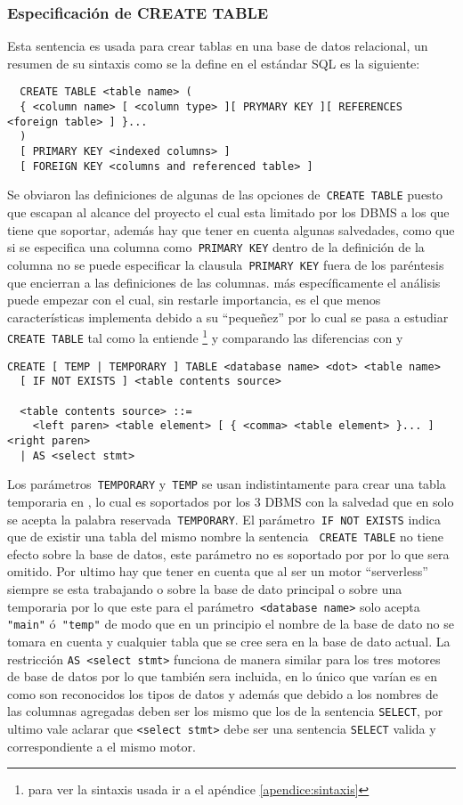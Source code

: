 \subsubsection{Especificación de CREATE TABLE} 
\label{especificacion:dialectos:create}
Esta sentencia es usada para crear tablas en una base de datos relacional, un resumen de su sintaxis como se la define en el estándar SQL es la siguiente:
\begin{Verbatim}
  CREATE TABLE <table name> (
  { <column name> [ <column type> ][ PRYMARY KEY ][ REFERENCES <foreign table> ] }...
  )
  [ PRIMARY KEY <indexed columns> ]
  [ FOREIGN KEY <columns and referenced table> ]
\end{Verbatim}
%
Se obviaron las definiciones de algunas de las opciones de\verb= CREATE TABLE= puesto que escapan al alcance del proyecto el cual esta limitado por los DBMS a los que tiene que soportar, además hay que tener en cuenta algunas salvedades, como que si se especifica una columna como\verb= PRIMARY KEY= dentro de la definición de la columna no se puede especificar la clausula\verb= PRIMARY KEY= fuera de los paréntesis que encierran a las definiciones de las columnas. más específicamente el análisis puede empezar con \s el cual, sin restarle importancia, es el que menos características implementa debido a su ``pequeñez'' por lo cual se pasa a estudiar\verb= CREATE TABLE= tal como la entiende \s\cite{sqlite:sql}\footnote{para ver la sintaxis usada ir a el apéndice \ref{apendice:sintaxis} } y comparando las diferencias con \m\citep{mysql:sql} y \p\citep{postgre:sql}
%
\begin{Verbatim}[frame=leftline, framesep=3mm]
  CREATE [ TEMP | TEMPORARY ] TABLE <database name> <dot> <table name> 
  [ IF NOT EXISTS ] <table contents source>

  <table contents source> ::=
    <left paren> <table element> [ { <comma> <table element> }... ] <right paren>
  | AS <select stmt>
\end{Verbatim}
%
Los parámetros\verb= TEMPORARY= y\verb= TEMP= se usan indistintamente para crear una tabla temporaria en \s, lo cual es soportados por los 3 DBMS con la salvedad que en \m solo se acepta la palabra reservada\verb= TEMPORARY=. El parámetro\verb= IF NOT EXISTS= indica que de existir una tabla del mismo nombre la sentencia \verb= CREATE TABLE= no tiene efecto sobre la base de datos, este parámetro no es soportado por \p por lo que sera omitido. Por ultimo hay que tener en cuenta que al ser \s un motor ``serverless'' siempre se esta trabajando o sobre la base de dato principal o sobre una temporaria por lo que este para el parámetro\verb= <database name>= solo acepta\verb= "main"= ó\verb= "temp"= de modo que en un principio el nombre de la base de dato no se tomara en cuenta y cualquier tabla que se cree sera en la base de dato actual.  La restricción \verb=AS <select stmt>= funciona de manera similar para los tres motores de base de datos por lo que también sera incluida, en lo único que varían es en como son reconocidos los tipos de datos y además que debido a \s los nombres de las columnas agregadas deben ser los mismo que los de la sentencia \verb=SELECT=, por ultimo vale aclarar que \verb=<select stmt>= debe ser una sentencia \verb=SELECT= valida y correspondiente a el mismo motor.
